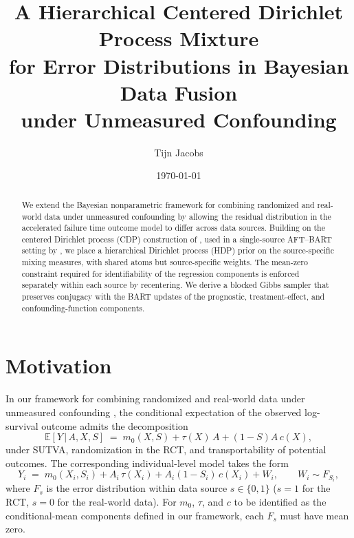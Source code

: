 \documentclass[11pt]{article}
\title{A Hierarchical Centered Dirichlet Process Mixture\\
       for Error Distributions in Bayesian Data Fusion\\
       under Unmeasured Confounding}
\author{Tijn Jacobs}
\date{\today}
\newcommand{\given}{\,|\,}
\newcommand{\E}{\mathbb{E}}
\newcommand{\1}{\mathbf{1}}
\begin{document}
\maketitle

\begin{abstract}
We extend the Bayesian nonparametric framework for combining randomized and real-world data under unmeasured confounding by allowing the residual distribution in the accelerated failure time outcome model to differ across data sources. Building on the centered Dirichlet process (CDP) construction of \citet{yang2010semiparametric}, used in a single-source AFT--BART setting by \citet{henderson2020individualized}, we place a hierarchical Dirichlet process (HDP) prior \citep{teh2006hierarchical} on the source-specific mixing measures, with shared atoms but source-specific weights. The mean-zero constraint required for identifiability of the regression components is enforced separately within each source by recentering. We derive a blocked Gibbs sampler that preserves conjugacy with the BART updates of the prognostic, treatment-effect, and confounding-function components.
\end{abstract}

\section{Motivation}

In our framework for combining randomized and real-world data under unmeasured confounding \citep{jacobs2026framework}, the conditional expectation of the observed log-survival outcome admits the decomposition
\begin{equation}
\E[Y \given A, X, S] \;=\; m_0(X, S) + \tau(X)\, A + (1 - S) A\, c(X),
\label{eq:cmean}
\end{equation}
under SUTVA, randomization in the RCT, and transportability of potential outcomes. The corresponding individual-level model takes the form
\begin{equation}
Y_i \;=\; m_0(X_i, S_i) + A_i\, \tau(X_i) + A_i(1 - S_i)\, c(X_i) + W_i, \qquad W_i \sim F_{S_i},
\label{eq:outcome}
\end{equation}
where $F_s$ is the error distribution within data source $s \in \{0, 1\}$ ($s=1$ for the RCT, $s=0$ for the real-world data). For $m_0$, $\tau$, and $c$ to be identified as the conditional-mean components defined in our framework, each $F_s$ must have mean zero.
\end{document}
